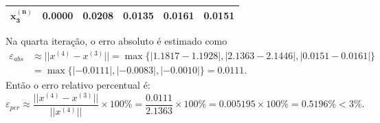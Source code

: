 \documentclass[12pt,a4paper]{article}
\begin{document}
\begin{ExerciseList}
\begin{enumerate}
\begin{center}
\begin{tabular}{|c|r|r|r|r|r|}
\hline
$\mathbf{x_3^{(n)}}$ & 0.0000 & 0.0208 & 0.0135 & 0.0161 & 0.0151 \\
\hline
\end{tabular}
\end{center}
\medskip
Na quarta iteração, o erro absoluto é estimado como
\begin{align*}
\varepsilon_{abs}
& \approx || x^{(4)} - x^{(3)} ||
= \max\{| 1.1817 - 1.1928 |,
        | 2.1363 - 2.1446 |,
        | 0.0151 - 0.0161 |\}\\
& = \max\{ |-0.0111|, |-0.0083|, |-0.0010| \}
= 0.0111.
\end{align*}
Então o erro relativo percentual é:
\[
\varepsilon_{per}
\approx
\frac{ || x^{(4)} - x^{(3)} || }{ || x^{(4)} || } \times 100 \%
= \frac{ 0.0111 }{ 2.1363 } \times 100 \%
= 0.005195 \times 100 \%
= 0.5196\% < 3\%.
\]
\end{enumerate}


\end{ExerciseList}
\end{document}
